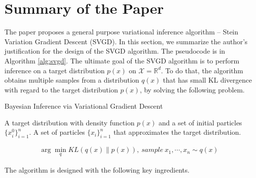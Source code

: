 \section{Summary of the Paper}

The paper proposes a general purpose variational inference algorithm -- Stein Variation Gradient Descent (SVGD). In this section, we summarize the author's justification for the design of the SVGD algorithm. The pseudocode is in Algorithm \ref{alg:svgd}. The ultimate goal of the SVGD algorithm is to perform inference on a target distribution $p(x)$ on $\mathcal{X}=\mathbb{R}^d$. To do that, the algorithm obtains multiple samples from a distribution $q(x)$ that has small KL divergence with regard to the target distribution $p(x)$, by solving the following problem.



\begin{algorithm}[t!]
	\caption{Bayesian Inference via Variational Gradient Descent~\cite{ref_article_svgd}}
	\label{alg:svgd}
	\begin{algorithmic}
		 A target distribution with density function $p(x)$ and a set of initial particles $\{x_i^0\}_{i=1}^n$.
		 A set of particles $\{x_i\}_{i=1}^n$ that approximates the target distribution.
		\ENDFOR
	\end{algorithmic}
\end{algorithm}

\begin{align}
    \arg\min_q KL(q(x)\lVert p(x)),\ sample\ x_1,\cdots,x_n\sim q(x)
\end{align}

The algorithm is designed with the following key ingredients.

